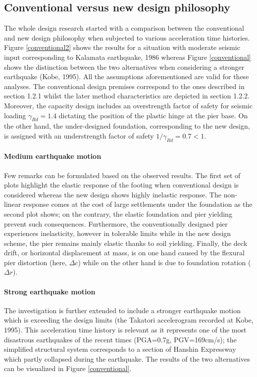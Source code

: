 \documentclass[12pt,a4paper]{report}
\begin{document}
\subsection{Conventional versus new design philosophy}
The whole design research started with a comparison between the conventional and new design philosophy when subjected to various acceleration time histories. Figure \ref{conventional2} shows the results for a situation with moderate seismic input corresponding to Kalamata earthquake, 1986 whereas Figure \ref{conventional} shows the distinction between the two alternatives when considering a stronger earthquake (Kobe, 1995). All the assumptions aforementioned are valid for these analyses. The conventional design premises correspond to the ones described in section 1.2.1 whilst the later method characteristics are depicted in section 1.2.2. Moreover, the capacity design includes an overstrength factor of safety for seismic loading $\gamma_{Rd}=1.4$ dictating the position of the plastic hinge at the pier base. On the other hand, the under-designed foundation, corresponding to the new design, is assigned with an understrength factor of safety $1/\gamma_{Rd}=0.7 <1$. 


\paragraph{Medium earthquake motion}
Few remarks can be formulated based on the observed results. The first set of plots highlight the elastic response of the footing when conventional design is considered whereas the new design shows highly inelastic response. The non-linear response comes at the cost of large settlements under the foundation as the second plot shows; on the contrary, the elastic foundation and pier yielding prevent such consequences. Furthermore, the conventionally designed pier experiences \mbox{inelasticity}, however in tolerable limits while in the new design scheme, the pier remains mainly elastic thanks to soil yielding. Finally, the deck drift, or horizontal displacement at mass, is on one hand caused by the flexural pier distortion (here, $\Delta c$) while on the other hand is due to foundation rotation ($\Delta r$). 

\paragraph{Strong earthquake motion}
The investigation is further extended to include a stronger earthquake motion which is exceeding the design limits (the Takatori accelerogram recorded at Kobe, 1995). This acceleration time history is relevant as it represents one of the most disastrous earthquakes of the recent times (PGA=0.7g, PGV=169cm/s); the simplified structural system corresponds to a section of Hanshin Expressway which partly collapsed during the earthquake. The results of the two alternatives can be visualized in Figure \ref{conventional}.
\end{document}
